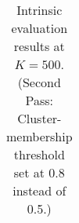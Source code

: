 \begin{table}[htb]
{\begin{tabular}{cc|cc|rrrrr}

\end{tabular}
}
\caption{Intrinsic evaluation results at $K = 500$. (Second Pass: Cluster-membership threshold set at 0.8 instead of 0.5.)}
\label{tab:results-500-2}
\end{table}

